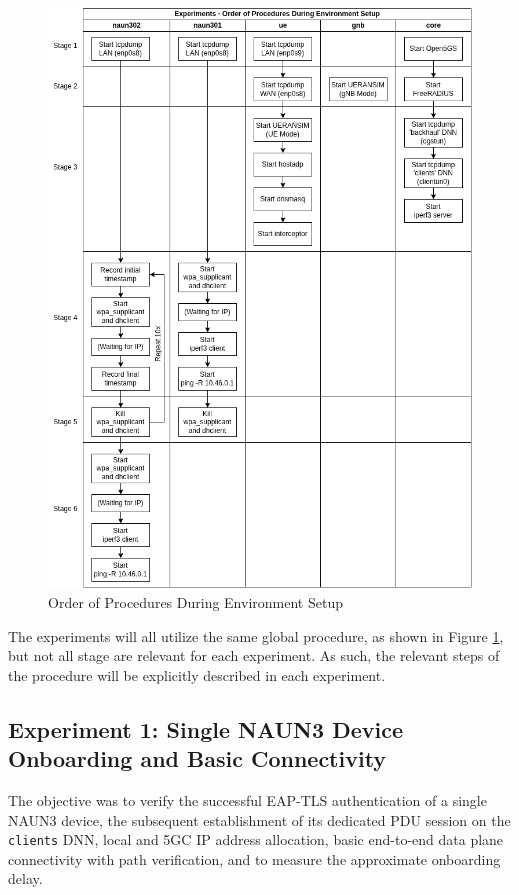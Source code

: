 \begin{figure}
    \centering
    \includegraphics[width=0.8\linewidth]{figs/order-of-procedures-during-environment-setup.png}
    \caption{Order of Procedures During Environment Setup}
    \label{fig:order-of-procedures-during-environment-setup}
\end{figure}

The experiments will all utilize the same global procedure, as shown in Figure \ref{fig:order-of-procedures-during-environment-setup}, but not all stage are relevant for each experiment. As such, the relevant steps of the procedure will be explicitly described in each experiment.

\subsection{Experiment 1: Single \acs{NAUN3} Device Onboarding and Basic Connectivity}

The objective was to verify the successful \ac{EAP-TLS} authentication of a single \ac{NAUN3} device, the subsequent establishment of its dedicated \ac{PDU} session on the \texttt{clients} \ac{DNN}, local and \ac{5GC} \ac{IP} address allocation, basic end-to-end data plane connectivity with path verification, and to measure the approximate onboarding delay.

